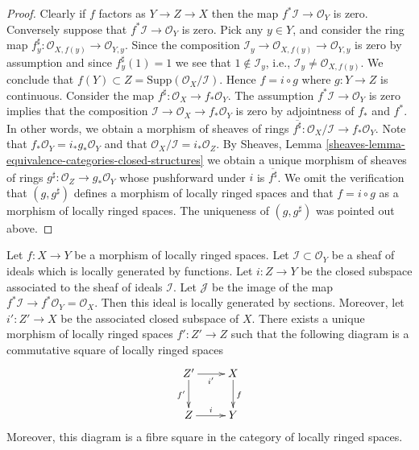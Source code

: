 \begin{proof}
Clearly if $f$ factors as $Y \to Z \to X$ then the map
$f^*\mathcal{I} \to \mathcal{O}_Y$ is zero. Conversely
suppose that $f^*\mathcal{I} \to \mathcal{O}_Y$ is zero.
Pick any $y \in Y$, and consider the ring map
$f^\sharp_y : \mathcal{O}_{X, f(y)} \to \mathcal{O}_{Y, y}$.
Since the composition
$\mathcal{I}_y \to \mathcal{O}_{X, f(y)} \to \mathcal{O}_{Y, y}$
is zero by assumption and since $f^\sharp_y(1) = 1$
we see that $1 \not \in \mathcal{I}_y$, i.e.,
$\mathcal{I}_y \not = \mathcal{O}_{X, f(y)}$. We conclude that
$f(Y) \subset Z = \text{Supp}(\mathcal{O}_X/\mathcal{I})$.
Hence $f = i \circ g$ where $g : Y \to Z$ is continuous.
Consider the map $f^\sharp : \mathcal{O}_X \to f_*\mathcal{O}_Y$.
The assumption $f^*\mathcal{I} \to \mathcal{O}_Y$ is zero implies that
the composition $\mathcal{I} \to \mathcal{O}_X \to f_*\mathcal{O}_Y$ is
zero by adjointness of $f_*$ and $f^*$.
In other words, we obtain a morphism of sheaves of rings
$\overline{f^\sharp} : \mathcal{O}_X/\mathcal{I} \to f_*\mathcal{O}_Y$.
Note that $f_*\mathcal{O}_Y = i_*g_*\mathcal{O}_Y$ and
that $\mathcal{O}_X/\mathcal{I} = i_*\mathcal{O}_Z$.
By Sheaves, Lemma \ref{sheaves-lemma-equivalence-categories-closed-structures}
we obtain a unique morphism of sheaves of rings
$g^\sharp : \mathcal{O}_Z \to g_*\mathcal{O}_Y$ whose pushforward
under $i$ is $\overline{f^\sharp}$. We omit the verification that
$(g, g^\sharp)$ defines a morphism of locally ringed spaces
and that $f = i \circ g$ as a morphism of locally ringed spaces.
The uniqueness of $(g, g^\sharp)$ was pointed out above.
\end{proof}

\begin{lemma}
\label{lemma-restrict-map-to-closed}
Let $f : X \to Y$ be a morphism of locally ringed spaces.
Let $\mathcal{I} \subset \mathcal{O}_Y$ be a sheaf of
ideals which is locally generated by functions.
Let $i : Z \to Y$ be the closed subspace associated to the
sheaf of ideals $\mathcal{I}$.
Let $\mathcal{J}$ be the image of the map
$f^*\mathcal{I} \to f^*\mathcal{O}_Y = \mathcal{O}_X$.
Then this ideal is locally generated by sections.
Moreover, let $i' : Z' \to X$ be the associated closed
subspace of $X$. There exists a unique
morphism of locally ringed spaces $f' : Z' \to Z$ such
that the following diagram is a commutative square of
locally ringed spaces
$$
\xymatrix{
Z' \ar[d]_{f'} \ar[r]_{i'} & X \ar[d]^f \\
Z \ar[r]^{i} & Y
}
$$
Moreover, this diagram is a fibre square in the category of
locally ringed spaces.
\end{lemma}

